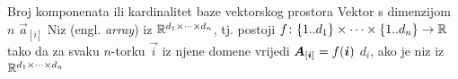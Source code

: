 	{Broj komponenata ili kardinalitet baze vektorskog prostora}
	{Vektor s dimenzijom $n$}
	{$\vec a_{[i]}$}
	{Niz (engl. \textit{array}) iz $\mathbb{R}^{d_1\times\dots\times d_n}$, tj. postoji $\funcdef{f}{\cbr{1..d_1}\times\dots\times\cbr{1..d_n}}{\R}$ tako da za svaku $n$-torku $\vec i$ iz njene domene vrijedi $\vec A_\ind{\vec i} = f(\vec i)$}
	{$d_i$, ako je niz iz $\mathbb{R}^{d_1\times\dots\times d_n}$}